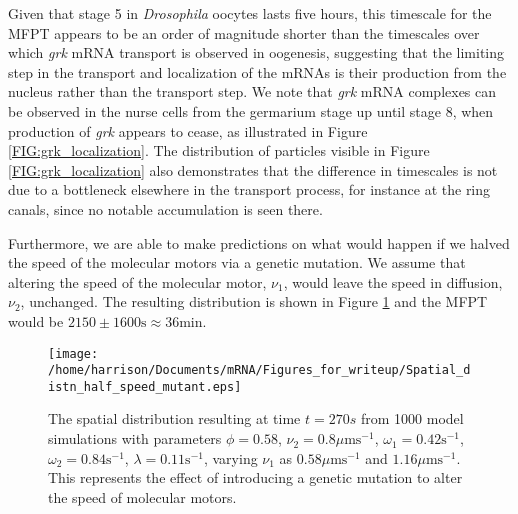 \documentclass[twocolumn]{biophys}
\newlength\tindent
\renewcommand{\indent}{\hspace*{\tindent}}
\begin{document}
Given that stage 5 in \textit{Drosophila} oocytes lasts five hours, this timescale for the MFPT appears to be an order of magnitude shorter than the timescales over which \textit{grk} mRNA transport is observed in oogenesis, suggesting that the limiting step in the transport and localization of the mRNAs is their production from the nucleus rather than the transport step.
We note that \textit{grk} mRNA complexes can be observed in the nurse cells from the germarium stage up until stage 8, when production of \textit{grk} appears to cease, as illustrated in Figure \ref{FIG:grk_localization}.
The distribution of particles visible in Figure \ref{FIG:grk_localization} also demonstrates that the difference in timescales is not due to a bottleneck elsewhere in the transport process, for instance at the ring canals, since no notable accumulation is seen there.


\indent Furthermore, we are able to make predictions on what would happen if we halved the speed of the molecular motors via a genetic mutation.
We assume that altering the speed of the molecular motor, $\nu_1$, would leave the speed in diffusion, $\nu_2$, unchanged.
The resulting distribution is shown in Figure \ref{FIG:Half_speed_q} and the MFPT would be $2150\pm1600 \text{s} \approx 36\text{min}$.
\begin{figure}[h]
 \centering
 \texttt{[image: /home/harrison/Documents/mRNA/Figures\_for\_writeup/Spatial\_distn\_half\_speed\_mutant.eps]}
 \caption{\small The spatial distribution resulting at time $t=270s$ from 1000 model simulations with parameters $\phi=0.58$, $\nu_2=0.8 \mu \text{ms}^{-1}$, $\omega_1=0.42 \text{s}^{-1}$, $\omega_2=0.84 \text{s}^{-1}$, $\lambda=0.11 \text{s}^{-1}$, varying $\nu_1$ as $0.58\mu \text{ms}^{-1}$ and $1.16\mu \text{ms}^{-1}$. 
 This represents the effect of introducing a genetic mutation to alter the speed of molecular motors.}
 \label{FIG:Half_speed_q}
\end{figure}
\end{document}
